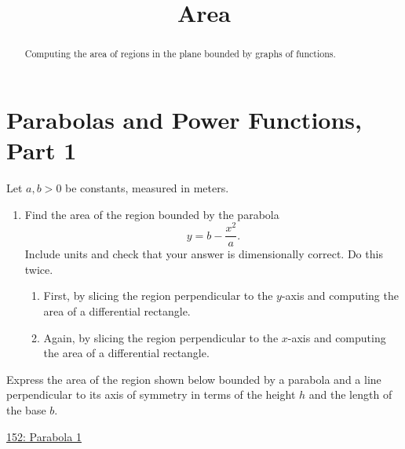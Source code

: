 \documentclass{ximera}
\title{Area}
\begin{document}
\begin{abstract}
Computing the area of regions in the plane bounded by graphs of functions.
\end{abstract}
\maketitle

\section{Parabolas and Power Functions, Part 1}

\begin{question} \label{QWeerFGHG}
Let $a,b>0$ be constants, measured in meters. 

\begin{enumerate}

\item Find the area of the region bounded by the parabola
\[
     y  = b - \frac{x^2}{a} .
\]
Include units and check that your answer is dimensionally correct. Do this twice.

\begin{enumerate}
\item First, by slicing the region perpendicular to the $y$-axis and computing the area of a differential rectangle.

\item Again, by slicing the region perpendicular to the $x$-axis and computing the area of a differential rectangle.
\end{enumerate}
\end{enumerate}
\end{question}

\begin{question} \label{QOLDFKRerbttp}
Express the area of the region shown below bounded by a parabola and a line perpendicular to its axis of symmetry in terms of the height $h$ and the length of the base $b$.

\begin{onlineOnly}
    \begin{center}
\end{center}
\end{onlineOnly}

\href{https://www.desmos.com/calculator/kkdfpr66rt}{152: Parabola 1}

\end{question}
\end{document}
